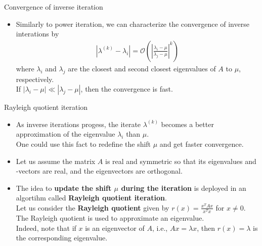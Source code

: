 \documentclass[t,usepdftitle=false]{beamer}
\begin{document}
\begin{frame}{Convergence of inverse iteration}
\begin{itemize}
\item Similarly to power iteration, we can characterize the convergence of inverse interations by
\begin{align*}
|\lambda^{(k)}-\lambda_i|=\mathcal{O}\left(\left|\frac{\lambda_i-\mu}{\lambda_j-\mu}\right|^k\right)
\end{align*}
where $\lambda_i$ and $\lambda_j$ are the closest and second closest eigenvalues of $A$ to $\mu$, respectively.\vspace{.1cm}\\
If $|\lambda_i-\mu|\ll|\lambda_j-\mu|$, then the convergence is fast.
\end{itemize}
\end{frame}

\begin{frame}{Rayleigh quotient iteration}
\begin{itemize}
\item As inverse iterations progess, the iterate $\lambda^{(k)}$ becomes a better approximation of the eigenvalue $\lambda_i$ than $\mu$.\vspace{.1cm}\\
One could use this fact to redefine the shift $\mu$ and get faster convergence.
\item Let us assume the matrix $A$ is real and symmetric so that its eigenvalues and -vectors are real, and the eigenvectors are orthogonal.
\item The idea to \textbf{update the shift $\mu$ during the iteration} is deployed in an algortihm called \textbf{Rayleigh quotient iteration}.\vspace{.1cm}\\
Let us consider the \textbf{Rayleigh quotient} given by $r(x)=\frac{x^TAx}{x^Tx}$ for $x\neq 0$.\vspace{.1cm}\\
The Rayleigh quotient is used to approximate an eigenvalue.\vspace{.1cm}\\
Indeed, note that if $x$ is an eigenvector of $A$, i.e., $Ax=\lambda x$, then $r(x)=\lambda$ is the corresponding eigenvalue.
\end{itemize}
\end{frame}
\end{document}
